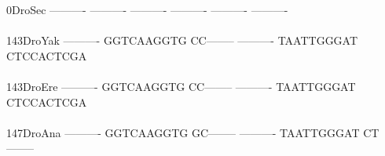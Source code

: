 \documentclass[11pt,twoside,reqno,a4paper]{article}
\begin{document}
{0\hspace*{3\charwidth}DroSec	----------	----------	----------	----------	----------	----------	\\
\hspace*{4\charwidth}\hspace*{7\charwidth}\hspace*{1\charwidth}\hspace*{1\charwidth}\hspace*{1\charwidth}\hspace*{1\charwidth}\hspace*{1\charwidth}\hspace*{1\charwidth}\\
143\hspace*{1\charwidth}DroYak	----------	GGTCAAGGTG	CC--------	----------	TAATTGGGAT	CTCCACTCGA	\\
\hspace*{4\charwidth}\hspace*{7\charwidth}\hspace*{1\charwidth}\hspace*{1\charwidth}\hspace*{1\charwidth}\hspace*{1\charwidth}\hspace*{1\charwidth}\hspace*{1\charwidth}\\
143\hspace*{1\charwidth}DroEre	----------	GGTCAAGGTG	CC--------	----------	TAATTGGGAT	CTCCACTCGA	\\
\hspace*{4\charwidth}\hspace*{7\charwidth}\hspace*{1\charwidth}\hspace*{1\charwidth}\hspace*{1\charwidth}\hspace*{1\charwidth}\hspace*{1\charwidth}\hspace*{1\charwidth}\\
147\hspace*{1\charwidth}DroAna	----------	GGTCAAGGTG	GC--------	----------	TAATTGGGAT	CT--------	\\
\hspace*{4\charwidth}\hspace*{7\charwidth}\hspace*{1\charwidth}\hspace*{1\charwidth}\hspace*{1\charwidth}\hspace*{1\charwidth}\hspace*{1\charwidth}\hspace*{1\charwidth}\\
}
\end{document}
